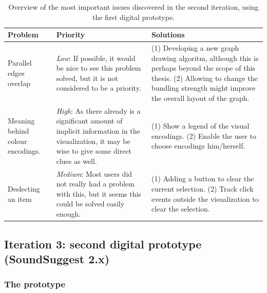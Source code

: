 \begin{table}
	\caption{Overview of the most important issues discovered in the second iteration, using the first digital prototype.}
	\begin{center}
		\begin{tabular}{p{70px} | p{180px} | p{180px} }
			\hline
			\textbf{Problem} & \textbf{Priority} & \textbf{Solutions} \\
			\hline
			
			Parallel edges overlap
			&
			\emph{Low}: If possible, it would be nice to see this problem solved, but it is not considered to be a priority.
			&
			(1) Developing a new graph drawing algoritm, although this is perhaps beyond the scope of this thesis. (2) Allowing to change the bundling strength might improve the overall layout of the graph.
			\\
			
			Meaning behind colour encodings.
			&
			\emph{High}: As there already is a significant amount of implicit information in the visualization, it may be wise to give some direct clues as well.
			&
			(1) Show a legend of the visual encodings. (2) Enable the user to choose encodings him/herself. %
			\\
			
			Deslecting an item
			&
			\emph{Medium}: Most users did not really had a problem with this, but it seems this could be solved easily enough.
			&
			(1) Adding a button to clear the current selection. (2) Track click events outside the visualization to clear the selection.
			\\
			
			\hline
		\end{tabular}
	\end{center}
\label{table:iteration2:issues}
\end{table}



\subsection{Iteration 3: second digital prototype (SoundSuggest 2.x)}\label{chapter:prototype:section:soundsuggest2}

\subsubsection{The prototype}\label{chapter:prototype:section:soundsuggest2:prototype}

